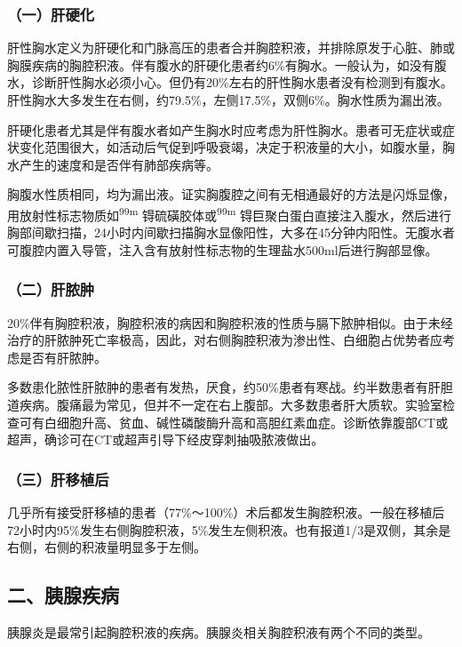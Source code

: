 \subsubsection{（一）肝硬化}

肝性胸水定义为肝硬化和门脉高压的患者合并胸腔积液，并排除原发于心脏、肺或胸膜疾病的胸腔积液。伴有腹水的肝硬化患者约6\%有胸水。一般认为，如没有腹水，诊断肝性胸水必须小心。但仍有20\%左右的肝性胸水患者没有检测到有腹水。肝性胸水大多发生在右侧，约79.5\%，左侧17.5\%，双侧6\%。胸水性质为漏出液。

肝硬化患者尤其是伴有腹水者如产生胸水时应考虑为肝性胸水。患者可无症状或症状变化范围很大，如活动后气促到呼吸衰竭，决定于积液量的大小，如腹水量，胸水产生的速度和是否伴有肺部疾病等。

胸腹水性质相同，均为漏出液。证实胸腹腔之间有无相通最好的方法是闪烁显像，用放射性标志物质如\textsuperscript{99m}
锝硫磺胶体或\textsuperscript{99m}
锝巨聚白蛋白直接注入腹水，然后进行胸部间歇扫描，24小时内间歇扫描胸水显像阳性，大多在45分钟内阳性。无腹水者可腹腔内置入导管，注入含有放射性标志物的生理盐水500ml后进行胸部显像。

\subsubsection{（二）肝脓肿}

20\%伴有胸腔积液，胸腔积液的病因和胸腔积液的性质与膈下脓肿相似。由于未经治疗的肝脓肿死亡率极高，因此，对右侧胸腔积液为渗出性、白细胞占优势者应考虑是否有肝脓肿。

多数患化脓性肝脓肿的患者有发热，厌食，约50\%患者有寒战。约半数患者有肝胆道疾病。腹痛最为常见，但并不一定在右上腹部。大多数患者肝大质软。实验室检查可有白细胞升高、贫血、碱性磷酸酶升高和高胆红素血症。诊断依靠腹部CT或超声，确诊可在CT或超声引导下经皮穿刺抽吸脓液做出。

\subsubsection{（三）肝移植后}

几乎所有接受肝移植的患者（77\%～100\%）术后都发生胸腔积液。一般在移植后72小时内95\%发生右侧胸腔积液，5\%发生左侧积液。也有报道1/3是双侧，其余是右侧，右侧的积液量明显多于左侧。

\subsection{二、胰腺疾病}

胰腺炎是最常引起胸腔积液的疾病。胰腺炎相关胸腔积液有两个不同的类型。

